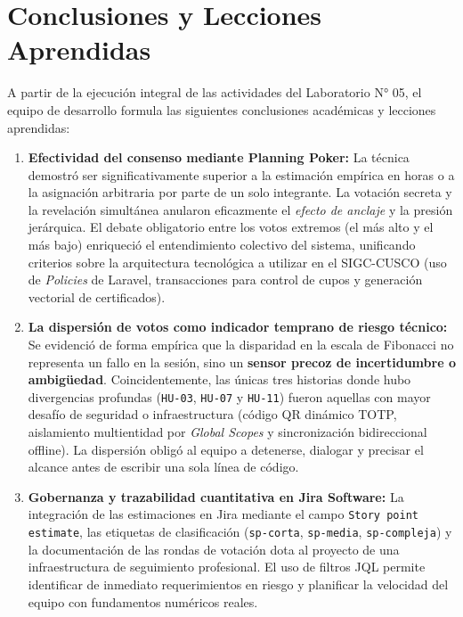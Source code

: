 \section{Conclusiones y Lecciones Aprendidas}

A partir de la ejecución integral de las actividades del Laboratorio N° 05, el equipo de desarrollo formula las siguientes conclusiones académicas y lecciones aprendidas:

\begin{enumerate}
    \item \textbf{Efectividad del consenso mediante Planning Poker:} La técnica demostró ser significativamente superior a la estimación empírica en horas o a la asignación arbitraria por parte de un solo integrante. La votación secreta y la revelación simultánea anularon eficazmente el \textit{efecto de anclaje} y la presión jerárquica. El debate obligatorio entre los votos extremos (el más alto y el más bajo) enriqueció el entendimiento colectivo del sistema, unificando criterios sobre la arquitectura tecnológica a utilizar en el SIGC-CUSCO (uso de \textit{Policies} de Laravel, transacciones para control de cupos y generación vectorial de certificados).
    
    \item \textbf{La dispersión de votos como indicador temprano de riesgo técnico:} Se evidenció de forma empírica que la disparidad en la escala de Fibonacci no representa un fallo en la sesión, sino un \textbf{sensor precoz de incertidumbre o ambigüedad}. Coincidentemente, las únicas tres historias donde hubo divergencias profundas (\texttt{HU-03}, \texttt{HU-07} y \texttt{HU-11}) fueron aquellas con mayor desafío de seguridad o infraestructura (código QR dinámico TOTP, aislamiento multientidad por \textit{Global Scopes} y sincronización bidireccional offline). La dispersión obligó al equipo a detenerse, dialogar y precisar el alcance antes de escribir una sola línea de código.
    
    \item \textbf{Gobernanza y trazabilidad cuantitativa en Jira Software:} La integración de las estimaciones en Jira mediante el campo \texttt{Story point estimate}, las etiquetas de clasificación (\texttt{sp-corta}, \texttt{sp-media}, \texttt{sp-compleja}) y la documentación de las rondas de votación dota al proyecto de una infraestructura de seguimiento profesional. El uso de filtros JQL permite identificar de inmediato requerimientos en riesgo y planificar la velocidad del equipo con fundamentos numéricos reales.
    

\end{enumerate}
